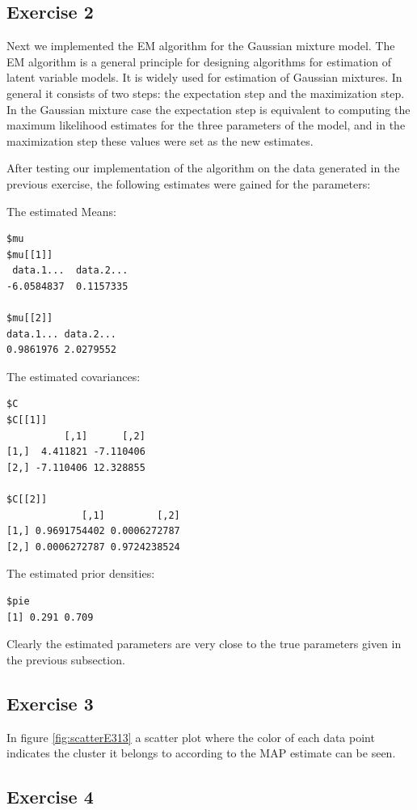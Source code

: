 \documentclass{article}
\begin{document}
\subsection{Exercise 2}
Next we implemented the EM algorithm for the Gaussian mixture
model. The EM algorithm is a general principle for designing
algorithms for estimation of latent variable models. It is widely used
for estimation of Gaussian mixtures. In general it consists of two
steps: the expectation step and the maximization step. In the Gaussian
mixture case the expectation step is equivalent to computing the
maximum likelihood estimates for the three parameters of the model,
and in the maximization step these values were set as the new
estimates.

After testing our implementation of the algorithm on the data generated in the previous
exercise, the following estimates were gained for the parameters:

\noindent The estimated Means:
\begin{verbatim}
$mu
$mu[[1]]
 data.1...  data.2... 
-6.0584837  0.1157335 

$mu[[2]]
data.1... data.2... 
0.9861976 2.0279552 
\end{verbatim}

\noindent The estimated covariances:
\begin{verbatim}
$C
$C[[1]]
          [,1]      [,2]
[1,]  4.411821 -7.110406
[2,] -7.110406 12.328855

$C[[2]]
             [,1]         [,2]
[1,] 0.9691754402 0.0006272787
[2,] 0.0006272787 0.9724238524
\end{verbatim}

\noindent The estimated prior densities:
\begin{verbatim}
$pie
[1] 0.291 0.709
\end{verbatim}

Clearly the estimated parameters are very close to the true parameters
given in the previous subsection.

\subsection{Exercise 3}

In figure \ref{fig:scatterE313} a scatter plot where the color of each data
point indicates the cluster it belongs to according to the MAP
estimate can be seen.

\subsection{Exercise 4}
\end{document}
